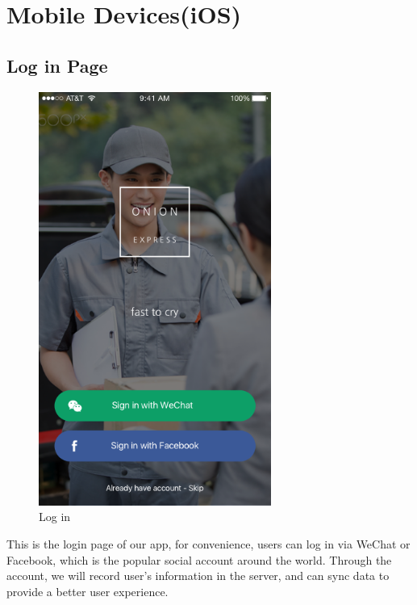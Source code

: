 \documentclass[12pt]{scrreprt}
\begin{document}
\section{Mobile Devices(iOS)}
\subsection{Log in Page}
\begin{figure}[htbp]
  \centering\includegraphics[width=3in]{DocumentRes/Login.png}
  \caption{Log in}
\end{figure}
This is the login page of our app, for convenience, users can log in via WeChat or Facebook, which is the popular social account around the world. Through the account, we will record user's information in the server, and can sync data to provide a better user experience.
\end{document}
